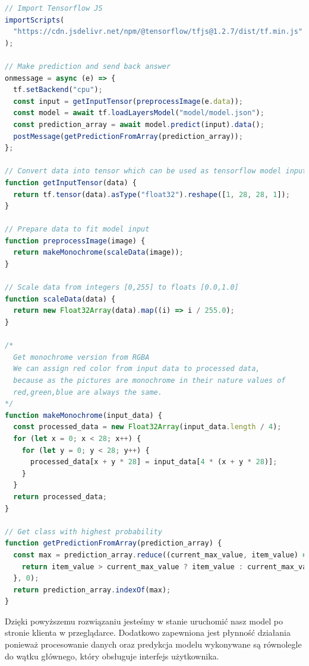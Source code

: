 \documentclass{article}
\begin{document}
\begin{lstlisting}[caption=Kod odpowiedzialny za predykcję (worker),language=JavaScript]
// Import Tensorflow JS
importScripts(
  "https://cdn.jsdelivr.net/npm/@tensorflow/tfjs@1.2.7/dist/tf.min.js"
);

// Make prediction and send back answer
onmessage = async (e) => {
  tf.setBackend("cpu");
  const input = getInputTensor(preprocessImage(e.data));
  const model = await tf.loadLayersModel("model/model.json");
  const prediction_array = await model.predict(input).data();
  postMessage(getPredictionFromArray(prediction_array));
};

// Convert data into tensor which can be used as tensorflow model input
function getInputTensor(data) {
  return tf.tensor(data).asType("float32").reshape([1, 28, 28, 1]);
}

// Prepare data to fit model input
function preprocessImage(image) {
  return makeMonochrome(scaleData(image));
}

// Scale data from integers [0,255] to floats [0.0,1.0]
function scaleData(data) {
  return new Float32Array(data).map((i) => i / 255.0);
}

/*
  Get monochrome version from RGBA
  We can assign red color from input data to processed data,
  because as the pictures are monochrome in their nature values of 
  red,green,blue are always the same.
*/
function makeMonochrome(input_data) {
  const processed_data = new Float32Array(input_data.length / 4);
  for (let x = 0; x < 28; x++) {
    for (let y = 0; y < 28; y++) {
      processed_data[x + y * 28] = input_data[4 * (x + y * 28)];
    }
  }
  return processed_data;
}

// Get class with highest probability
function getPredictionFromArray(prediction_array) {
  const max = prediction_array.reduce((current_max_value, item_value) => {
    return item_value > current_max_value ? item_value : current_max_value;
  }, 0);
  return prediction_array.indexOf(max);
}
\end{lstlisting}

Dzięki powyższemu rozwiązaniu jesteśmy w stanie uruchomić nasz model po stronie klienta w przeglądarce.
Dodatkowo zapewniona jest płynność działania ponieważ procesowanie danych oraz predykcja modelu wykonywane są równolegle do wątku głównego, który obsługuje interfejs użytkownika.
\end{document}
